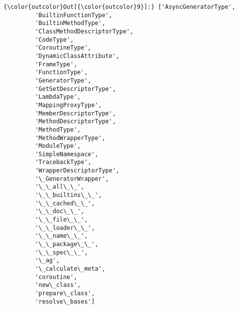 \begin{Verbatim}[commandchars=\\\{\},frame=single,framerule=0.3mm,rulecolor=\color{cellframecolor}]
{\color{outcolor}Out[{\color{outcolor}9}]:} ['AsyncGeneratorType',
         'BuiltinFunctionType',
         'BuiltinMethodType',
         'ClassMethodDescriptorType',
         'CodeType',
         'CoroutineType',
         'DynamicClassAttribute',
         'FrameType',
         'FunctionType',
         'GeneratorType',
         'GetSetDescriptorType',
         'LambdaType',
         'MappingProxyType',
         'MemberDescriptorType',
         'MethodDescriptorType',
         'MethodType',
         'MethodWrapperType',
         'ModuleType',
         'SimpleNamespace',
         'TracebackType',
         'WrapperDescriptorType',
         '\_GeneratorWrapper',
         '\_\_all\_\_',
         '\_\_builtins\_\_',
         '\_\_cached\_\_',
         '\_\_doc\_\_',
         '\_\_file\_\_',
         '\_\_loader\_\_',
         '\_\_name\_\_',
         '\_\_package\_\_',
         '\_\_spec\_\_',
         '\_ag',
         '\_calculate\_meta',
         'coroutine',
         'new\_class',
         'prepare\_class',
         'resolve\_bases']
\end{Verbatim}
            

    
    
    

